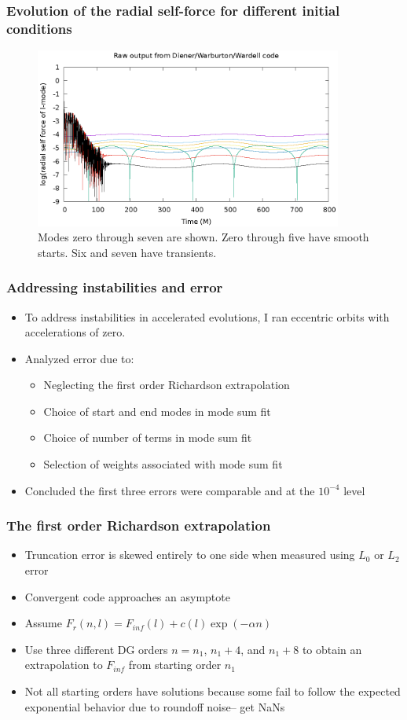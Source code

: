 \documentclass{beamer}
\begin{document}
\begin{frame}
  \frametitle{Evolution of the radial self-force for different initial conditions}
  \begin{figure}
  \includegraphics[width=0.9\textwidth]{rawRadialSelForceModes}
  \caption{Modes zero through seven are shown. Zero through five have smooth starts. Six and seven have transients.}
  \end{figure}
\end{frame}

\begin{frame}
  \frametitle{Addressing instabilities and error}
  \begin{itemize}
  \item To address instabilities in accelerated evolutions, I ran eccentric orbits with accelerations of zero.
  \item Analyzed error due to:
    \begin{itemize}
    \item Neglecting the first order Richardson extrapolation
    \item Choice of start and end modes in mode sum fit
    \item Choice of number of terms in mode sum fit
    \item Selection of weights associated with mode sum fit
    \end{itemize}
  \item Concluded the first three errors were comparable and at the $10^{-4}$ level
  \end{itemize}
\end{frame}

\begin{frame}
  \frametitle{The first order Richardson extrapolation}
  \begin{itemize}
  \item Truncation error is skewed entirely to one side when measured using $L_0$ or $L_2$ error
  \item Convergent code approaches an asymptote
  \item Assume $F_r(n,l)=F_{inf}(l)+c(l)\exp(-\alpha n)$
  \item Use three different DG orders $n=n_1$, $n_1+4$, and $n_1+8$ to obtain an extrapolation to $F_{inf}$ from starting order $n_1$
  \item Not all starting orders have solutions because some fail to follow the expected exponential behavior due to roundoff noise-- get NaNs
  \end{itemize}
\end{frame}
\end{document}
